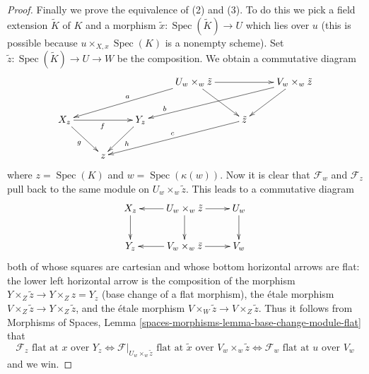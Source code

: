 \documentclass[10pt,a4paper]{amsart}
\theoremstyle{plain}
\theoremstyle{definition}
\theoremstyle{remark}
\numberwithin{equation}{subsection}
\def\Spec{\mathop{\mathrm{Spec}}}
\begin{document}
\begin{proof}
\medskip\noindent
Finally we prove the equivalence of (2) and (3).
To do this we pick a field extension $\tilde K$ of $K$
and a morphism $\tilde x : \Spec(\tilde K) \to U$ which
lies over $u$ (this is possible because $u \times_{X, x} \Spec(K)$
is a nonempty scheme). Set $\tilde z : \Spec(\tilde K) \to U \to W$
be the composition. We obtain a commutative diagram
$$
\xymatrix{
& & & U_w \times_w \tilde z \ar[llld]_a \ar[rr] \ar[dr] & &
V_w \times_w \tilde z \ar[llld]_>>>>>>>b \ar[dl] \\
X_z \ar[rr]_f \ar[dr]_g & & Y_z \ar[dl]^h &  & \tilde z \ar[llld]_c \\
& z
}
$$
where $z = \Spec(K)$ and $w = \Spec(\kappa(w))$. Now it
is clear that $\mathcal{F}_w$ and $\mathcal{F}_z$ pull back to the
same module on $U_w \times_w \tilde z$. This leads to a commutative
diagram
$$
\xymatrix{
X_z \ar[d] & U_w \times_w \tilde z \ar[l] \ar[d] \ar[r] & U_w \ar[d] \\
Y_z & V_w \times_w \tilde z \ar[l] \ar[r] & V_w
}
$$
both of whose squares are cartesian and whose bottom horizontal
arrows are flat: the lower left horizontal arrow is the composition
of the morphism $Y \times_Z \tilde z \to Y \times_Z z = Y_z$ (base change
of a flat morphism), the \'etale morphism
$V \times_Z \tilde z \to Y \times_Z \tilde z$, and
the \'etale morphism $V \times_W \tilde z \to V \times_Z \tilde z$.
Thus it follows from
Morphisms of Spaces,
Lemma \ref{spaces-morphisms-lemma-base-change-module-flat}
that
$$
\mathcal{F}_z\text{ flat at }x\text{ over }Y_z
\Leftrightarrow
\mathcal{F}|_{U_w \times_w \tilde z}
\text{ flat at }\tilde x\text{ over }V_w \times_w \tilde z
\Leftrightarrow
\mathcal{F}_w\text{ flat at }u\text{ over }V_w
$$
and we win.
\end{proof}
\end{document}
